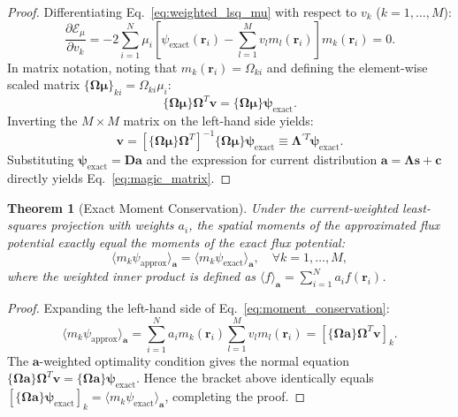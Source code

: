 \documentclass[11pt,a4paper]{article}
\newtheorem{theorem}{Theorem}
\begin{document}
\begin{proof}
Differentiating Eq.~\eqref{eq:weighted_lsq_mu} with respect to $v_k$ ($k=1,\dots,M$):
\begin{equation}
    \frac{\partial \mathcal{E}_\mu}{\partial v_k} = -2 \sum_{i=1}^N \mu_i \left[ \psi_{\mathrm{exact}}(\bm{r}_i) - \sum_{l=1}^M v_l m_l(\bm{r}_i) \right] m_k(\bm{r}_i) = 0.
\end{equation}
In matrix notation, noting that $m_k(\bm{r}_i) = \Omega_{ki}$ and defining the element-wise scaled matrix $\{\bm{\Omega}\bm{\mu}\}_{ki} = \Omega_{ki} \mu_i$:
\begin{equation}
    \{\bm{\Omega}\bm{\mu}\} \bm{\Omega}^T \bm{v} = \{\bm{\Omega}\bm{\mu}\} \bm{\psi}_{\mathrm{exact}}.
    \label{eq:normal}
\end{equation}
Inverting the $M \times M$ matrix on the left-hand side yields:
\begin{equation}
    \bm{v} = \left[ \{\bm{\Omega}\bm{\mu}\} \bm{\Omega}^T \right]^{-1} \{\bm{\Omega}\bm{\mu}\} \bm{\psi}_{\mathrm{exact}} \equiv \bm{\Lambda}^{\prime T} \bm{\psi}_{\mathrm{exact}}.
\end{equation}
Substituting $\bm{\psi}_{\mathrm{exact}} = \bm{D} \bm{a}$ and the expression for current distribution $\bm{a} = \bm{\Lambda}\bm{s} + \bm{c}$ directly yields Eq.~\eqref{eq:magic_matrix}.
\end{proof}

\begin{theorem}[Exact Moment Conservation]
Under the current-weighted least-squares projection with weights $a_i$, the spatial moments of the approximated flux potential exactly equal the moments of the exact flux potential:
\begin{equation}
    \langle m_k \psi_{\mathrm{approx}} \rangle_{\bm{a}} = \langle m_k \psi_{\mathrm{exact}} \rangle_{\bm{a}}, \quad \forall k = 1, \dots, M,
    \label{eq:moment_conservation}
\end{equation}
where the weighted inner product is defined as $\langle f \rangle_{\bm{a}} = \sum_{i=1}^N a_i f(\bm{r}_i)$.
\end{theorem}

\begin{proof}
Expanding the left-hand side of Eq.~\eqref{eq:moment_conservation}:
\begin{equation}
    \langle m_k \psi_{\mathrm{approx}} \rangle_{\bm{a}} = \sum_{i=1}^N a_i m_k(\bm{r}_i) \sum_{l=1}^M v_l m_l(\bm{r}_i) = \left[ \{\bm{\Omega}\bm{a}\} \bm{\Omega}^T \bm{v} \right]_k.
\end{equation}
The $\bm{a}$-weighted optimality condition gives the normal equation $\{\bm{\Omega}\bm{a}\}\bm{\Omega}^T\bm{v} = \{\bm{\Omega}\bm{a}\}\bm{\psi}_{\mathrm{exact}}$. Hence the bracket above identically equals $[\{\bm{\Omega}\bm{a}\} \bm{\psi}_{\mathrm{exact}}]_k = \langle m_k \psi_{\mathrm{exact}} \rangle_{\bm{a}}$, completing the proof.
\end{proof}
\end{document}
